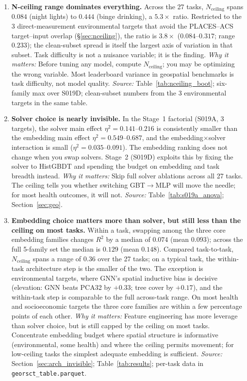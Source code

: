 \documentclass{article}
\begin{document}
\begin{enumerate}

\item \textbf{N-ceiling range dominates everything.}
Across the 27 tasks, $N_{\text{ceiling}}$ spans $0.084$ (night lights) to $0.444$ (binge drinking), a $5.3{\times}$ ratio. Restricted to the 3 direct-measurement environmental targets that avoid the PLACES--ACS target--input overlap (\S\ref{sec:nceiling}), the ratio is $3.8{\times}$ ($0.084$--$0.317$; range $0.233$); the clean-subset spread is itself the largest axis of variation in that subset. Task difficulty is not a nuisance variable; it is the finding.
\emph{Why it matters:} Before tuning any model, compute $N_{\text{ceiling}}$; you may be optimizing the wrong variable. Most leaderboard variance in geospatial benchmarks is task difficulty, not model quality.
\emph{Source:} Table~\ref{tab:nceiling_boot}; six-family max over S019D; clean-subset numbers from the 3 environmental targets in the same table.

\item \textbf{Solver choice is nearly invisible.}
In the Stage~1 factorial (S019A, 3 targets), the solver main effect $\eta^2 = 0.141$--$0.216$ is consistently smaller than the embedding main effect $\eta^2 = 0.549$--$0.687$, and the embedding$\times$solver interaction is small ($\eta^2 = 0.035$--$0.091$). The embedding ranking does not change when you swap solvers. Stage~2 (S019D) exploits this by fixing the solver to HistGBDT and spending the budget on embedding and task breadth instead.
\emph{Why it matters:} Skip full solver ablations across all 27 tasks. The ceiling tells you whether switching GBT$\to$MLP will move the needle; for most health outcomes, it will not.
\emph{Source:} Table~\ref{tab:s019a_anova}; Section~\ref{sec:geo}.

\item \textbf{Embedding choice matters more than solver, but still less than the ceiling on most tasks.}
Within a task, swapping among the three core embedding families changes $R^2$ by a median of $0.074$ (mean $0.093$); across the full 5-family set the median is $0.129$ (mean $0.148$). Compared task-to-task, $N_{\text{ceiling}}$ spans a range of $0.36$ over the 27 tasks; on a typical task, the within-task architecture step is the smaller of the two. The exception is environmental targets, where GNN's spatial inductive bias is decisive (elevation: GNN beats PCA32 by $+0.33$; tree cover by $+0.17$), and the within-task step is comparable to the full across-task range. On most health and socioeconomic targets the three core families are within a few percentage points of each other.
\emph{Why it matters:} Feature engineering has more leverage than solver choice, but is still capped by the ceiling on most tasks. Concentrate embedding budget where spatial structure is informative (environmental, some health) and where the ceiling permits movement; for low-ceiling tasks the simplest adequate embedding is sufficient.
\emph{Source:} Section~\ref{sec:arch_invisible}; Table~\ref{tab:results}; per-task data in \texttt{georsct\_table.parquet}.


\end{enumerate}
\end{document}
